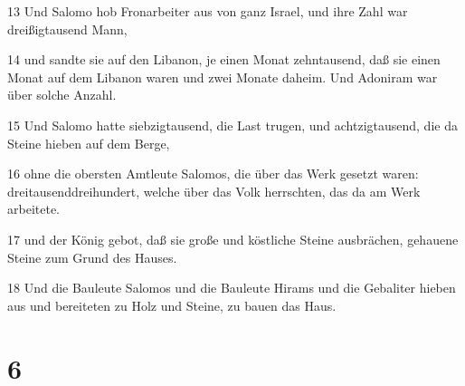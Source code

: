 \par 13 Und Salomo hob Fronarbeiter aus von ganz Israel, und ihre Zahl war dreißigtausend Mann,
\par 14 und sandte sie auf den Libanon, je einen Monat zehntausend, daß sie einen Monat auf dem Libanon waren und zwei Monate daheim. Und Adoniram war über solche Anzahl.
\par 15 Und Salomo hatte siebzigtausend, die Last trugen, und achtzigtausend, die da Steine hieben auf dem Berge,
\par 16 ohne die obersten Amtleute Salomos, die über das Werk gesetzt waren: dreitausenddreihundert, welche über das Volk herrschten, das da am Werk arbeitete.
\par 17 und der König gebot, daß sie große und köstliche Steine ausbrächen, gehauene Steine zum Grund des Hauses.
\par 18 Und die Bauleute Salomos und die Bauleute Hirams und die Gebaliter hieben aus und bereiteten zu Holz und Steine, zu bauen das Haus.

\chapter{6}

